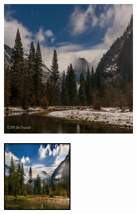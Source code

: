 \documentclass{article}
\begin{document}
\begin{figure}[H]
    \centering
    \begin{subfigure}{.165\textwidth}
        \centering
        \includegraphics[width=0.75\linewidth]{Input_1.jpg}
    \end{subfigure}%
    \begin{subfigure}{.165\textwidth}
        \centering
        \includegraphics[width=0.75\linewidth]{output_1_cycle_gan.png}
    \end{subfigure}%
    \begin{subfigure}{.165\textwidth}
        \centering

\end{subfigure}
\end{figure}
\end{document}
